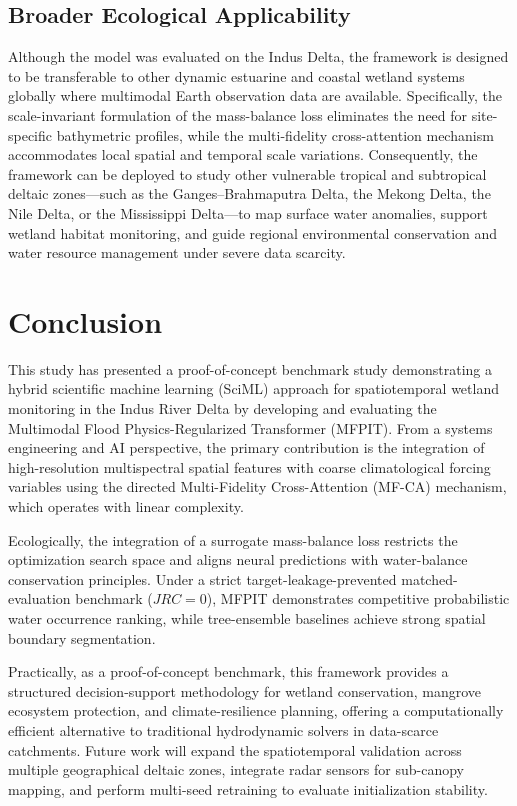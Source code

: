 \documentclass[preprint,12pt]{elsarticle}
\begin{document}
\subsection{Broader Ecological Applicability}
Although the model was evaluated on the Indus Delta, the framework is designed to be transferable to other dynamic estuarine and coastal wetland systems globally where multimodal Earth observation data are available. Specifically, the scale-invariant formulation of the mass-balance loss eliminates the need for site-specific bathymetric profiles, while the multi-fidelity cross-attention mechanism accommodates local spatial and temporal scale variations. Consequently, the framework can be deployed to study other vulnerable tropical and subtropical deltaic zones---such as the Ganges--Brahmaputra Delta, the Mekong Delta, the Nile Delta, or the Mississippi Delta---to map surface water anomalies, support wetland habitat monitoring, and guide regional environmental conservation and water resource management under severe data scarcity.

\section{Conclusion}
This study has presented a proof-of-concept benchmark study demonstrating a hybrid scientific machine learning (SciML) approach for spatiotemporal wetland monitoring in the Indus River Delta by developing and evaluating the Multimodal Flood Physics-Regularized Transformer (MFPIT). From a systems engineering and AI perspective, the primary contribution is the integration of high-resolution multispectral spatial features with coarse climatological forcing variables using the directed Multi-Fidelity Cross-Attention (MF-CA) mechanism, which operates with linear complexity. 

Ecologically, the integration of a surrogate mass-balance loss restricts the optimization search space and aligns neural predictions with water-balance conservation principles. Under a strict target-leakage-prevented matched-evaluation benchmark ($JRC=0$), MFPIT demonstrates competitive probabilistic water occurrence ranking, while tree-ensemble baselines achieve strong spatial boundary segmentation. 

Practically, as a proof-of-concept benchmark, this framework provides a structured decision-support methodology for wetland conservation, mangrove ecosystem protection, and climate-resilience planning, offering a computationally efficient alternative to traditional hydrodynamic solvers in data-scarce catchments. Future work will expand the spatiotemporal validation across multiple geographical deltaic zones, integrate radar sensors for sub-canopy mapping, and perform multi-seed retraining to evaluate initialization stability.
\end{document}
